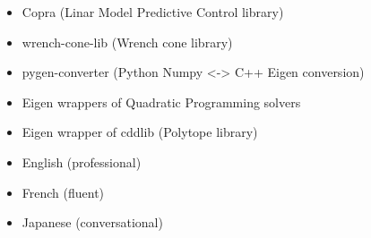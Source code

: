 








\divider

\divider

\divider

\divider

\divider

\divider

\divider



\begin{itemize}[leftmargin=7mm]
    \item Copra (Linar Model Predictive Control library)
    \item wrench-cone-lib (Wrench cone library)
    \item pygen-converter (Python Numpy <-> C++ Eigen conversion)
    \item Eigen wrappers of Quadratic Programming solvers
    \item Eigen wrapper of cddlib (Polytope library)
\end{itemize}


\begin{itemize}[leftmargin=7mm]
    \item English (professional)
    \item French (fluent)
    \item Japanese (conversational)
\end{itemize}


